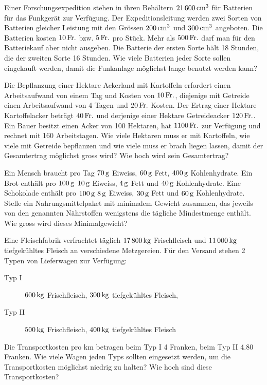 \documentclass[%
11pt,%
twoside,%
titlepage,%
german,%
headsepline%
]{scrartcl}
\begin{document}
\begin{ueb}
Einer Forschungsexpedition stehen in ihren Beh\"altern $\unit[21\,600]{cm^3}$ f\"ur Batterien f\"ur das Funkger\"at zur Verf\"ugung. Der Expeditionsleitung werden zwei Sorten von Batterien gleicher Leistung mit den Gr\"ossen $\unit[200]{cm^3}$ und $\unit[300]{cm^3}$ angeboten. Die Batterien kosten $\unit[10]{Fr.}$ bzw. $\unit[5]{Fr.}$ pro St\"uck. Mehr als $\unit[500]{Fr.}$ darf man f\"ur den Batteriekauf aber nicht ausgeben. Die Batterie der ersten Sorte h\"alt 18 Stunden, die der zweiten Sorte 16 Stunden. Wie viele Batterien jeder Sorte sollen eingekauft werden, damit die Funkanlage m\"oglichst lange benutzt werden kann?
\end{ueb}

\begin{ueb}
Die Bepflanzung einer Hektare Ackerland mit Kartoffeln erfordert einen Arbeitsaufwand von einem Tag und Kosten von $\unit[10]{Fr.}$, diejenige mit Getreide einen Arbeitsaufwand von 4 Tagen und $\unit[20]{Fr.}$ Kosten. Der Ertrag einer Hektare Kartoffelacker betr\"agt $\unit[40]{Fr.}$ und derjenige einer Hektare Getreideacker $\unit[120]{Fr.}$. Ein Bauer besitzt einen Acker von 100 Hektaren, hat $\unit[1100]{Fr.}$ zur Verf\"ugung und rechnet mit 160 Arbeitstagen. Wie viele Hektaren muss er mit Kartoffeln, wie viele mit Getreide bepflanzen und wie viele muss er brach liegen lassen, damit der Gesamtertrag m\"oglichst gross wird? Wie hoch wird sein Gesamtertrag?
\end{ueb}

\begin{ueb}
Ein Mensch braucht pro Tag $\unit[70]{g}$ Eiweiss, $\unit[60]{g}$ Fett, $\unit[400]{g}$ Kohlenhydrate. Ein Brot enth\"alt pro $\unit[100]{g}$ $\unit[10]{g}$ Eiweiss, $\unit[4]{g}$ Fett und $\unit[40]{g}$ Kohlenhydrate. Eine Schokolade enth\"alt pro $\unit[100]{g}$ $\unit[8]{g}$ Eiweiss, $\unit[30]{g}$ Fett und $\unit[60]{g}$ Kohlenhydrate. Stelle ein Nahrungsmittelpaket mit minimalem Gewicht zusammen, das jeweils von den genannten N\"ahrstoffen wenigstens die t\"agliche Mindestmenge enth\"alt. Wie gross wird dieses Minimalgewicht?
\end{ueb}

\begin{ueb}
Eine Fleischfabrik verfrachtet t\"aglich $\unit[17\,800]{kg}$ Frischfleisch und $\unit[11\,000]{kg}$ tiefgek\"uhltes Fleisch an verschiedene Metzgereien. F\"ur den Versand stehen 2 Typen von Lieferwagen zur Verf\"ugung:

\begin{description}
\item[Typ I] $\unit[600]{kg}$ Frischfleisch, $\unit[300]{kg}$ tiefgek\"uhltes Fleisch,
\item[Typ II] $\unit[500]{kg}$ Frischfleisch, $\unit[400]{kg}$ tiefgek\"uhltes Fleisch
\end{description}

Die Transportkosten pro km betragen beim Typ I 4 Franken, beim Typ II 4.80 Franken. Wie viele Wagen jeden Typs sollten eingesetzt werden, um die Transportkosten m\"oglichst niedrig zu halten? Wie hoch sind diese Transportkosten?
\end{ueb}
\end{document}
